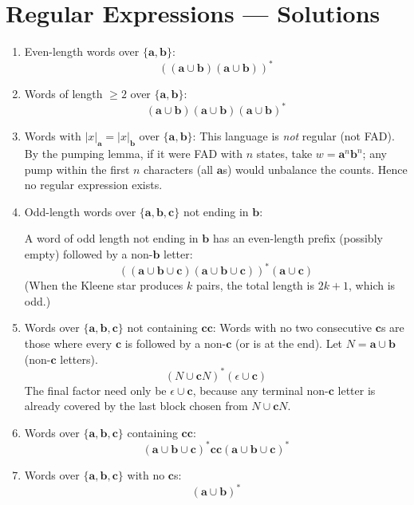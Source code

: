 
\chapter{Regular Expressions --- Solutions}

\begin{enumerate}[{6.}1.]

\item Even-length words over $\{\pmb{a},\pmb{b}\}$:
\[
  ((\pmb{a}\cup\pmb{b})(\pmb{a}\cup\pmb{b}))^*
\]

\item Words of length $\ge 2$ over $\{\pmb{a},\pmb{b}\}$:
\[
  (\pmb{a}\cup\pmb{b})(\pmb{a}\cup\pmb{b})(\pmb{a}\cup\pmb{b})^*
\]

\item Words with $|x|_{\pmb{a}}=|x|_{\pmb{b}}$ over $\{\pmb{a},\pmb{b}\}$: This language is \emph{not} regular (not FAD).  By the pumping lemma, if it were FAD with $n$ states, take $w=\pmb{a}^n\pmb{b}^n$; any pump within the first $n$ characters (all $\pmb{a}$s) would unbalance the counts.  Hence no regular expression exists.

\item Odd-length words over $\{\pmb{a},\pmb{b},\pmb{c}\}$ not ending in $\pmb{b}$:

A word of odd length not ending in $\pmb{b}$ has an even-length prefix (possibly empty) followed by a non-$\pmb{b}$ letter:
\[
  ((\pmb{a}\cup\pmb{b}\cup\pmb{c})(\pmb{a}\cup\pmb{b}\cup\pmb{c}))^*(\pmb{a}\cup\pmb{c})
\]
(When the Kleene star produces $k$ pairs, the total length is $2k+1$, which is odd.)

\item Words over $\{\pmb{a},\pmb{b},\pmb{c}\}$ not containing $\pmb{cc}$:
Words with no two consecutive $\pmb{c}$s are those where every $\pmb{c}$ is followed by a non-$\pmb{c}$ (or is at the end).  Let $N=\pmb{a}\cup\pmb{b}$ (non-$\pmb{c}$ letters).
\[
  (N \cup \pmb{c}N)^*(\epsilon \cup \pmb{c})
\]
The final factor need only be $\epsilon\cup\pmb{c}$, because any terminal
non-$\pmb{c}$ letter is already covered by the last block chosen from
$N\cup\pmb{c}N$.

\item Words over $\{\pmb{a},\pmb{b},\pmb{c}\}$ containing $\pmb{cc}$:
\[
  (\pmb{a}\cup\pmb{b}\cup\pmb{c})^*\pmb{cc}(\pmb{a}\cup\pmb{b}\cup\pmb{c})^*
\]

\item Words over $\{\pmb{a},\pmb{b},\pmb{c}\}$ with no $\pmb{c}$s:
\[
  (\pmb{a}\cup\pmb{b})^*
\]


\end{enumerate}

